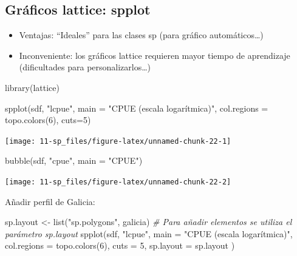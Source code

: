 \documentclass[
  spanish,
]{book}
\newenvironment{Shaded}{\begin{snugshade}}{\end{snugshade}}
\newcommand{\AttributeTok}[1]{\textcolor[rgb]{0.77,0.63,0.00}{#1}}
\newcommand{\CommentTok}[1]{\textcolor[rgb]{0.56,0.35,0.01}{\textit{#1}}}
\newcommand{\DecValTok}[1]{\textcolor[rgb]{0.00,0.00,0.81}{#1}}
\newcommand{\FunctionTok}[1]{\textcolor[rgb]{0.00,0.00,0.00}{#1}}
\newcommand{\NormalTok}[1]{#1}
\newcommand{\OtherTok}[1]{\textcolor[rgb]{0.56,0.35,0.01}{#1}}
\newcommand{\StringTok}[1]{\textcolor[rgb]{0.31,0.60,0.02}{#1}}
\theoremstyle{break}
\theoremstyle{definition}
\theoremstyle{definition}
\theoremstyle{definition}
\theoremstyle{definition}
\theoremstyle{remark}
\begin{document}
\hypertarget{gruxe1ficos-lattice-spplot}{%
\subsection{Gráficos lattice: spplot}\label{gruxe1ficos-lattice-spplot}}

\begin{itemize}
\item
  Ventajas: ``Ideales'' para las clases sp (para gráfico automáticos\ldots)
\item
  Inconveniente: los gráficos lattice requieren mayor tiempo de aprendizaje (dificultades para personalizarlos\ldots)
\end{itemize}

\begin{Shaded}
\begin{Highlighting}[]
\FunctionTok{library}\NormalTok{(lattice)}

\FunctionTok{spplot}\NormalTok{(sdf, }\StringTok{"lcpue"}\NormalTok{, }\AttributeTok{main =} \StringTok{"CPUE (escala logarítmica)"}\NormalTok{, }
       \AttributeTok{col.regions =} \FunctionTok{topo.colors}\NormalTok{(}\DecValTok{6}\NormalTok{), }\AttributeTok{cuts=}\DecValTok{5}\NormalTok{)}
\end{Highlighting}
\end{Shaded}

\begin{center}\texttt{[image: 11-sp\_files/figure-latex/unnamed-chunk-22-1]} \end{center}

\begin{Shaded}
\begin{Highlighting}[]
\FunctionTok{bubble}\NormalTok{(sdf, }\StringTok{"cpue"}\NormalTok{, }\AttributeTok{main =} \StringTok{"CPUE"}\NormalTok{) }
\end{Highlighting}
\end{Shaded}

\begin{center}\texttt{[image: 11-sp\_files/figure-latex/unnamed-chunk-22-2]} \end{center}

Añadir perfil de Galicia:

\begin{Shaded}
\begin{Highlighting}[]
\NormalTok{sp.layout }\OtherTok{\textless{}{-}} \FunctionTok{list}\NormalTok{(}\StringTok{"sp.polygons"}\NormalTok{, galicia)   }\CommentTok{\# Para añadir elementos se utiliza el parámetro sp.layout}
\FunctionTok{spplot}\NormalTok{(sdf, }\StringTok{"lcpue"}\NormalTok{, }\AttributeTok{main =} \StringTok{"CPUE (escala logarítmica)"}\NormalTok{, }
       \AttributeTok{col.regions =} \FunctionTok{topo.colors}\NormalTok{(}\DecValTok{6}\NormalTok{), }\AttributeTok{cuts =} \DecValTok{5}\NormalTok{, }\AttributeTok{sp.layout =}\NormalTok{ sp.layout )}
\end{Highlighting}
\end{Shaded}
\end{document}
